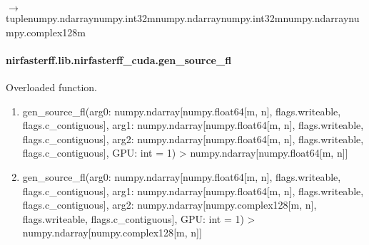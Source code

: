 \documentclass[letterpaper,10pt,english]{sphinxmanual}
\begin{document}
\begin{fulllineitems}
{{ $\rightarrow$ tuple\DUrole{p}{{[}}numpy.ndarray\DUrole{p}{{[}}numpy.int32\DUrole{p}{{[}}m\DUrole{p}{{]}}\DUrole{p}{{]}}numpy.ndarray\DUrole{p}{{[}}numpy.int32\DUrole{p}{{[}}m\DUrole{p}{{]}}\DUrole{p}{{]}}numpy.ndarray\DUrole{p}{{[}}numpy.complex128\DUrole{p}{{[}}m\DUrole{p}{{]}}\DUrole{p}{{]}}\DUrole{p}{{]}}}}
\pysigstopsignatures
\end{fulllineitems}


\sphinxstepscope


\paragraph{nirfasterff.lib.nirfasterff\_cuda.gen\_source\_fl}
\label{\detokenize{_autosummary/nirfasterff.lib.nirfasterff_cuda.gen_source_fl:nirfasterff-lib-nirfasterff-cuda-gen-source-fl}}\label{\detokenize{_autosummary/nirfasterff.lib.nirfasterff_cuda.gen_source_fl::doc}}

\begin{fulllineitems}
\label{\detokenize{_autosummary/nirfasterff.lib.nirfasterff_cuda.gen_source_fl:nirfasterff.lib.nirfasterff_cuda.gen_source_fl}}
\pysigstartsignatures
\pysiglinewithargsret
{}
{\sphinxparamcomma {}}
{}
\pysigstopsignatures
\sphinxAtStartPar
Overloaded function.
\begin{enumerate}
%
\item {} 
\sphinxAtStartPar
gen\_source\_fl(arg0: numpy.ndarray{[}numpy.float64{[}m, n{]}, flags.writeable, flags.c\_contiguous{]}, arg1: numpy.ndarray{[}numpy.float64{[}m, n{]}, flags.writeable, flags.c\_contiguous{]}, arg2: numpy.ndarray{[}numpy.float64{[}m, n{]}, flags.writeable, flags.c\_contiguous{]}, GPU: int = \sphinxhyphen{}1) \sphinxhyphen{}\textgreater{} numpy.ndarray{[}numpy.float64{[}m, n{]}{]}

\item {} 
\sphinxAtStartPar
gen\_source\_fl(arg0: numpy.ndarray{[}numpy.float64{[}m, n{]}, flags.writeable, flags.c\_contiguous{]}, arg1: numpy.ndarray{[}numpy.float64{[}m, n{]}, flags.writeable, flags.c\_contiguous{]}, arg2: numpy.ndarray{[}numpy.complex128{[}m, n{]}, flags.writeable, flags.c\_contiguous{]}, GPU: int = \sphinxhyphen{}1) \sphinxhyphen{}\textgreater{} numpy.ndarray{[}numpy.complex128{[}m, n{]}{]}

\end{enumerate}

\end{fulllineitems}
\end{document}
